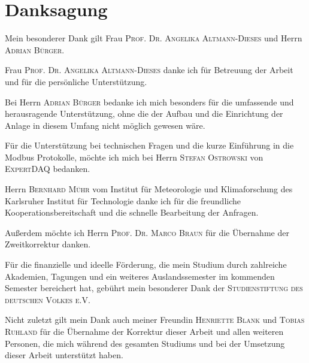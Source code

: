 %
%
%
\chapter*{Danksagung}
\thispagestyle{empty}

\noindent Mein besonderer Dank gilt Frau \textsc{Prof. Dr. Angelika Altmann-Dieses} und Herrn \textsc{Adrian Bürger}.

\noindent Frau \textsc{Prof. Dr. Angelika Altmann-Dieses} danke ich für Betreuung der Arbeit und für die persönliche Unterstützung.

\noindent Bei Herrn \textsc{Adrian Bürger} bedanke ich mich besonders für die umfassende und herausragende Unterstützung, ohne die der Aufbau und die Einrichtung der Anlage in diesem Umfang nicht möglich gewesen wäre.

\noindent Für die Unterstützung bei technischen Fragen und die kurze Einführung in die Modbus Protokolle, möchte ich mich bei Herrn \textsc{Stefan Ostrowski} von \textsc{ExpertDAQ} bedanken.

\noindent Herrn \textsc{Bernhard Mühr} vom Institut für Meteorologie und Klimaforschung des Karlsruher Institut für Technologie danke ich für die freundliche Kooperationsbereitschaft und die schnelle Bearbeitung der Anfragen.

\noindent Außerdem möchte ich Herrn \textsc{Prof. Dr. Marco Braun} für die Übernahme der Zweitkorrektur danken.

\noindent Für die finanzielle und ideelle Förderung, die mein Studium durch zahlreiche Akademien, Tagungen und ein weiteres Auslandssemester im kommenden Semester bereichert hat, gebührt mein besonderer Dank der \textsc{Studienstiftung des deutschen Volkes e.V.}

\noindent Nicht zuletzt gilt mein Dank auch meiner Freundin \textsc{Henriette Blank} und \textsc{Tobias Ruhland} für die Übernahme der Korrektur dieser Arbeit und allen weiteren Personen, die mich während des gesamten Studiums und bei der Umsetzung dieser Arbeit unterstützt haben.
